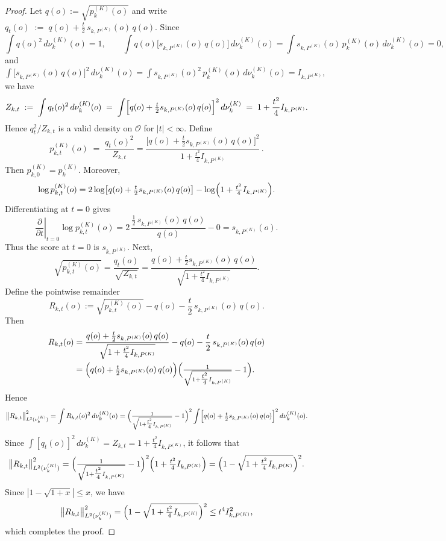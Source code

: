 \documentclass[10pt,a4paper]{amsart}
\begin{document}
\begin{proof}
Let $q(o):=\sqrt{p_k^{(K)}(o)}$ and write $q_t(o)\;:=\;q(o)+\frac{t}{2}\,s_{k,P^{(K)}}(o)\,q(o).$
Since 
\[
\int q(o)^2\,d\nu_k^{(K)}(o)=1,\qquad
\int q(o)\bigl[s_{k,P^{(K)}}(o)\,q(o)\bigr]\,d\nu_k^{(K)}(o)
=\int s_{k,P^{(K)}}(o)\,p_k^{(K)}(o)\,d\nu_k^{(K)}(o)=0,
\]
and $\int\bigl[s_{k,P^{(K)}}(o)\,q(o)\bigr]^2\,d\nu_k^{(K)}(o)
=\int s_{k,P^{(K)}}(o)^2\,p_k^{(K)}(o)\,d\nu_k^{(K)}(o)
=I_{k,P^{(K)}},$
we have
\[
Z_{k,t}\;:=\;\int q_t(o)^2\,d\nu_k^{(K)}(o)
\;=\;\int\Bigl[q(o)+\tfrac{t}{2}s_{k,P^{(K)}}(o)\,q(o)\Bigr]^2\,d\nu_k^{(K)}
\;=\;1+\frac{t^2}{4}I_{k,P^{(K)}}.
\]
Hence $q_t^2/Z_{k,t}$ is a valid density on $\mathcal O$ for $|t| < \infty$.  Define
\[
p_{k,t}^{(K)}(o)\;=\;\frac{q_t(o)^2}{Z_{k,t}}
=\frac{\bigl[q(o)+\tfrac{t}{2}s_{k,P^{(K)}}(o)\,q(o)\bigr]^2}
{\,1+\tfrac{t^2}{4}I_{k,P^{(K)}}\,}\,.
\]
Then $p_{k,0}^{(K)}=p_k^{(K)}$.  Moreover, 
\[
\log p_{k,t}^{(K)}(o)
=2\log\bigl[q(o)+\tfrac{t}{2}s_{k,P^{(K)}}(o)\,q(o)\bigr]
-\log\Bigl(1+\tfrac{t^2}{4}I_{k,P^{(K)}}\Bigr).
\]
Differentiating at $t=0$ gives
\[
\left.\frac{\partial}{\partial t}\right|_{t=0}\log p_{k,t}^{(K)}(o)
=2\,\frac{\tfrac12\,s_{k,P^{(K)}}(o)\,q(o)}{q(o)}-0
=s_{k,P^{(K)}}(o).
\]
Thus the score at $t=0$ is $s_{k,P^{(K)}}$.  Next, 
\[
\sqrt{p_{k,t}^{(K)}(o)}
=\frac{q_t(o)}{\sqrt{Z_{k,t}}}
=\frac{q(o)+\tfrac{t}{2}s_{k,P^{(K)}}(o)\,q(o)}{\sqrt{1+\tfrac{t^2}{4}I_{k,P^{(K)}}}}.
\]
Define the pointwise remainder
\[
R_{k,t}(o)
:=\sqrt{p_{k,t}^{(K)}(o)}-q(o)-\frac{t}{2}\,s_{k,P^{(K)}}(o)\,q(o).
\]
Then
\begin{align*}
R_{k,t}(o)
&=\frac{q(o)+\tfrac{t}{2}s_{k,P^{(K)}}(o)\,q(o)}{\sqrt{1+\tfrac{t^2}{4}I_{k,P^{(K)}}}}
-q(o)-\frac{t}{2}\,s_{k,P^{(K)}}(o)\,q(o)\\
&=\Bigl(q(o)+\tfrac{t}{2}s_{k,P^{(K)}}(o)\,q(o)\Bigr)
\Bigl(\tfrac{1}{\sqrt{1+\tfrac{t^2}{4}I_{k,P^{(K)}}}}-1\Bigr).
\end{align*}
Hence 
\[
\bigl\lVert R_{k,t}\bigr\rVert_{L^2(\nu_k^{(K)})}^2
=\int R_{k,t}(o)^2\,d\nu_k^{(K)}(o)
=\Bigl(\tfrac{1}{\sqrt{1+\tfrac{t^2}{4}I_{k,P^{(K)}}}}-1\Bigr)^2
\int\Bigl[q(o)+\tfrac{t}{2}s_{k,P^{(K)}}(o)\,q(o)\Bigr]^2\,d\nu_k^{(K)}(o).
\]
Since $\int[q_t(o)]^2\,d\nu_k^{(K)}=Z_{k,t}=1+\tfrac{t^2}{4}I_{k,P^{(K)}}$, it follows that
\[
\bigl\lVert R_{k,t}\bigr\rVert_{L^2(\nu_k^{(K)})}^2
=\Bigl(\tfrac{1}{\sqrt{1+\tfrac{t^2}{4}I_{k,P^{(K)}}}}-1\Bigr)^2
\Bigl(1+\tfrac{t^2}{4}I_{k,P^{(K)}}\Bigr)
=\Bigl(1-\sqrt{1+\tfrac{t^2}{4}I_{k,P^{(K)}}}\Bigr)^2.
\]
Since $|1 - \sqrt{1+x}|\leq x$, we have 
\[
\bigl\lVert R_{k,t}\bigr\rVert_{L^2(\nu_k^{(K)})}^2
=\Bigl(1-\sqrt{1+\tfrac{t^2}{4}I_{k,P^{(K)}}}\Bigr)^2  \leq t^4  I_{k,P^{(K)}}^2,
\]
which completes the proof.
\end{proof}
\end{document}
